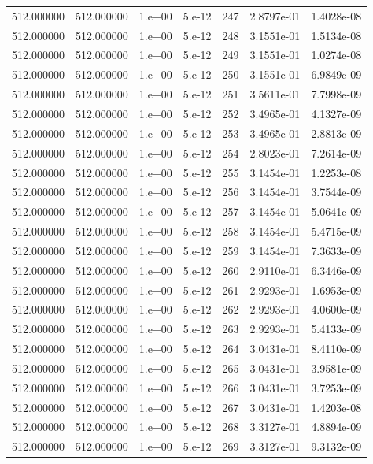 \begin{table}[htbp]
\begin{tabular}{rrrrrrr}
512.000000 & 512.000000 & 1.e+00 & 5.e-12 & 247 & 2.8797e-01 & 1.4028e-08 \\
512.000000 & 512.000000 & 1.e+00 & 5.e-12 & 248 & 3.1551e-01 & 1.5134e-08 \\
512.000000 & 512.000000 & 1.e+00 & 5.e-12 & 249 & 3.1551e-01 & 1.0274e-08 \\
512.000000 & 512.000000 & 1.e+00 & 5.e-12 & 250 & 3.1551e-01 & 6.9849e-09 \\
512.000000 & 512.000000 & 1.e+00 & 5.e-12 & 251 & 3.5611e-01 & 7.7998e-09 \\
512.000000 & 512.000000 & 1.e+00 & 5.e-12 & 252 & 3.4965e-01 & 4.1327e-09 \\
512.000000 & 512.000000 & 1.e+00 & 5.e-12 & 253 & 3.4965e-01 & 2.8813e-09 \\
512.000000 & 512.000000 & 1.e+00 & 5.e-12 & 254 & 2.8023e-01 & 7.2614e-09 \\
512.000000 & 512.000000 & 1.e+00 & 5.e-12 & 255 & 3.1454e-01 & 1.2253e-08 \\
512.000000 & 512.000000 & 1.e+00 & 5.e-12 & 256 & 3.1454e-01 & 3.7544e-09 \\
512.000000 & 512.000000 & 1.e+00 & 5.e-12 & 257 & 3.1454e-01 & 5.0641e-09 \\
512.000000 & 512.000000 & 1.e+00 & 5.e-12 & 258 & 3.1454e-01 & 5.4715e-09 \\
512.000000 & 512.000000 & 1.e+00 & 5.e-12 & 259 & 3.1454e-01 & 7.3633e-09 \\
512.000000 & 512.000000 & 1.e+00 & 5.e-12 & 260 & 2.9110e-01 & 6.3446e-09 \\
512.000000 & 512.000000 & 1.e+00 & 5.e-12 & 261 & 2.9293e-01 & 1.6953e-09 \\
512.000000 & 512.000000 & 1.e+00 & 5.e-12 & 262 & 2.9293e-01 & 4.0600e-09 \\
512.000000 & 512.000000 & 1.e+00 & 5.e-12 & 263 & 2.9293e-01 & 5.4133e-09 \\
512.000000 & 512.000000 & 1.e+00 & 5.e-12 & 264 & 3.0431e-01 & 8.4110e-09 \\
512.000000 & 512.000000 & 1.e+00 & 5.e-12 & 265 & 3.0431e-01 & 3.9581e-09 \\
512.000000 & 512.000000 & 1.e+00 & 5.e-12 & 266 & 3.0431e-01 & 3.7253e-09 \\
512.000000 & 512.000000 & 1.e+00 & 5.e-12 & 267 & 3.0431e-01 & 1.4203e-08 \\
512.000000 & 512.000000 & 1.e+00 & 5.e-12 & 268 & 3.3127e-01 & 4.8894e-09 \\
512.000000 & 512.000000 & 1.e+00 & 5.e-12 & 269 & 3.3127e-01 & 9.3132e-09 \\

\end{tabular}
\end{table}
